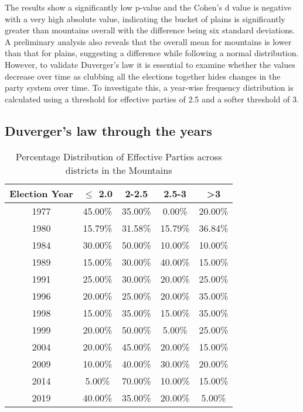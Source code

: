 \vspace{0.3cm}

The results show a significantly low p-value and the Cohen's d value is negative with a very high absolute value, indicating the bucket of plains is significantly greater than mountains overall with the difference being six standard deviations. 
A preliminary analysis also reveals that the overall mean for mountains is lower than that for plains,  suggesting a difference while following a normal distribution. However, to validate Duverger's law it is essential to examine whether the values decrease over time as clubbing all the elections together hides changes in the party system over time. To investigate this, a year-wise frequency distribution is calculated using a threshold for effective parties of 2.5 and a softer threshold of 3.
\subsection{Duverger's law through the years}
\begin{table}[h]
\centering
\begin{tabular}{|c|c|c|c|c|}
\hline
Election Year & $\leq$ 2.0 & 2-2.5 & 2.5-3 & >3 \\ \hline
1977 & 45.00\% & 35.00\% & 0.00\% & 20.00\% \\ \hline
1980 & 15.79\% & 31.58\% & 15.79\% & 36.84\% \\ \hline
1984 & 30.00\% & 50.00\% & 10.00\% & 10.00\% \\ \hline
1989 & 15.00\% & 30.00\% & 40.00\% & 15.00\% \\ \hline
1991 & 25.00\% & 30.00\% & 20.00\% & 25.00\% \\ \hline
1996 & 20.00\% & 25.00\% & 20.00\% & 35.00\% \\ \hline
1998 & 15.00\% & 35.00\% & 15.00\% & 35.00\% \\ \hline
1999 & 20.00\% & 50.00\% & 5.00\% & 25.00\% \\ \hline
2004 & 20.00\% & 45.00\% & 20.00\% & 15.00\% \\ \hline
2009 & 10.00\% & 40.00\% & 30.00\% & 20.00\% \\ \hline
2014 & 5.00\% & 70.00\% & 10.00\% & 15.00\% \\ \hline
2019 & 40.00\% & 35.00\% & 20.00\% & 5.00\% \\ \hline

\end{tabular}
\caption{Percentage Distribution of Effective Parties  across districts in the Mountains}
\label{tab:mountain_percentage_district}
\end{table}

